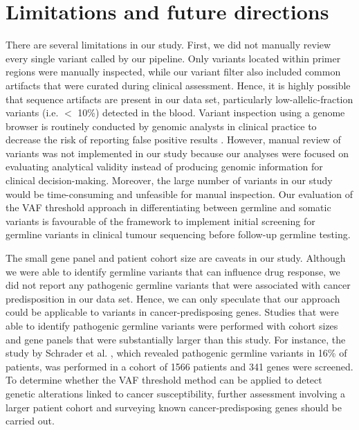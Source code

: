 \section{Limitations and future directions}
\label{sec:Limitationsandfuturedirections}

There are several limitations in our study. First, we did not manually review every single variant called by our pipeline. Only variants located within primer regions were manually inspected, while our variant filter also included common artifacts that were curated during clinical assessment. Hence, it is highly possible that sequence artifacts are present in our data set, particularly low-allelic-fraction variants (i.e. $<$ 10\%) detected in the blood. Variant inspection using a genome browser is routinely conducted by genomic analysts in clinical practice to decrease the risk of reporting false positive results \cite{Strom2016, Garofalo2016}. However, manual review of variants was not implemented in our study because our analyses were focused on evaluating analytical validity instead of producing genomic information for clinical decision-making. Moreover, the large number of variants in our study would be time-consuming and unfeasible for manual inspection. Our evaluation of the VAF threshold approach in differentiating between germline and somatic variants is favourable of the framework to implement initial screening for germline variants in clinical tumour sequencing before follow-up germline testing.

The small gene panel and patient cohort size are caveats in our study. Although we were able to identify germline variants that can influence drug response, we did not report any pathogenic germline variants that were associated with cancer predisposition in our data set. Hence, we can only speculate that our approach could be applicable to variants in cancer-predisposing genes. Studies that were able to identify pathogenic germline variants were performed with cohort sizes and gene panels that were substantially larger than this study. For instance, the study by Schrader et al. \cite{Schrader2015}, which revealed pathogenic germline variants in 16\% of patients, was performed in a cohort of 1566 patients and 341 genes were screened. To determine whether the VAF threshold method can be applied to detect genetic alterations linked to cancer susceptibility, further assessment involving a larger patient cohort and surveying known cancer-predisposing genes should be carried out.


